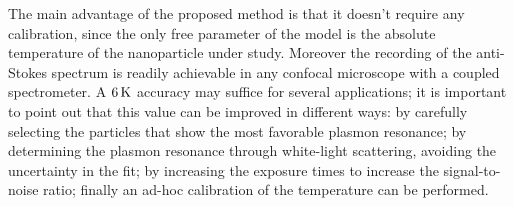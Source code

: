 The main advantage of the proposed method is that it doesn't require any
calibration, since the only free parameter of the model is the absolute
temperature of the nanoparticle under study. Moreover the recording of the
anti-Stokes spectrum is readily achievable in any confocal microscope with a
coupled spectrometer. A $6\,\textrm{K}$ accuracy may suffice for several applications; it
is important to point out that this value can be improved in different ways: by
carefully selecting the particles that show the most favorable plasmon
resonance; by determining the plasmon resonance through white-light scattering,
avoiding the uncertainty in the fit; by increasing the exposure times to
increase the signal-to-noise ratio; finally an ad-hoc calibration of the
temperature can be performed.


